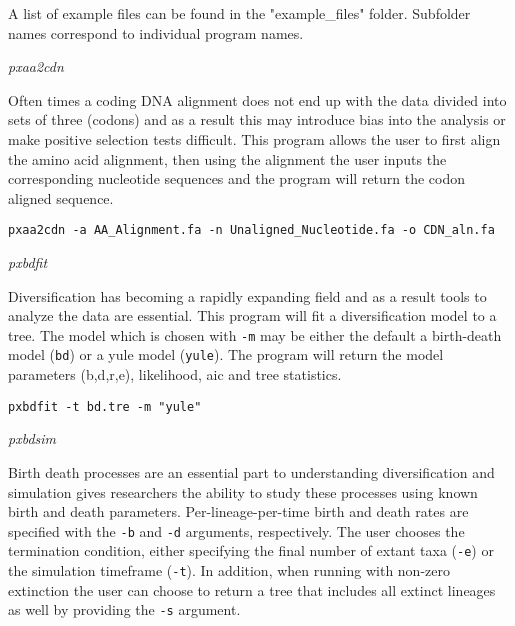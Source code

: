 \documentclass[12pt,letterpaper]{article}
\renewcommand{\subsection}[1]{%
\bigskip
\begin{center}
\begin{large}
\normalfont\itshape #1
\end{large}
\end{center}}
\begin{document}
A list of example files can be found in the "example\_files" folder. Subfolder names correspond to individual program names.

\subsection{pxaa2cdn}

Often times a coding DNA alignment does not end up with the data divided into sets of three (codons) and as a result this may introduce bias into the analysis or make positive selection tests difficult. This program allows the user to first align the amino acid alignment, then using the alignment the user inputs the corresponding nucleotide sequences and the program will return the codon aligned sequence.
\begin{flushleft}
\begin{verbatim}
pxaa2cdn -a AA_Alignment.fa -n Unaligned_Nucleotide.fa -o CDN_aln.fa
\end{verbatim}
\end{flushleft}

\subsection{pxbdfit}

Diversification has becoming a rapidly expanding field and as a result tools to analyze the data are essential. This program will fit a diversification model to a tree. The model which is chosen with \texttt{-m} may be either the default a birth-death model (\texttt{bd}) or a yule model (\texttt{yule}). The program will return the model parameters (b,d,r,e), likelihood, aic and tree statistics.
\begin{flushleft}
\begin{verbatim}
pxbdfit -t bd.tre -m "yule"
\end{verbatim}
\end{flushleft}

\subsection{pxbdsim}

Birth death processes are an essential part to understanding diversification and simulation gives researchers the ability to study these processes using known birth and death parameters. Per-lineage-per-time birth and death rates are specified with the \texttt{-b} and \texttt{-d} arguments, respectively. The user chooses the termination condition, either specifying the final number of extant taxa (\texttt{-e}) or the simulation timeframe (\texttt{-t}). In addition, when running with non-zero extinction the user can choose to return a tree that includes all extinct lineages as well by providing the \texttt{-s} argument.
\end{document}
